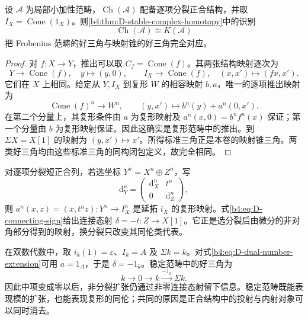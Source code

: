 \begin{proposition}\label{b4:prop:D-complex-triangle-identification}
	设 \(\mathcal A\) 为局部小加性范畴，\(\operatorname{Ch}(\mathcal A)\) 配备逐项分裂正合结构，并取 \(I_X=\operatorname{Cone}(1_X)\)。则\cref{b4:thm:D-stable-complex-homotopy}中的识别
	\[
		\underline{\operatorname{Ch}(\mathcal A)}\cong K(\mathcal A)
	\]
	把 Frobenius 范畴的好三角与映射锥的好三角完全对应。
\end{proposition}
\begin{proof}
	对 \(f:X\to Y\)，推出可以取 \(C_f=\operatorname{Cone}(f)\)。其两张结构映射逐次为
	\[
		Y\longrightarrow\operatorname{Cone}(f),\quad y\longmapsto(y,0), \qquad I_X\longrightarrow\operatorname{Cone}(f),\quad (x,x')\longmapsto(fx,x').
	\]
	它们在 \(X\) 上相同。给定从 \(Y,I_X\) 到复形 \(W\) 的相容映射 \(b,a\)，唯一的逐项推出映射为
	\[
		\operatorname{Cone}(f)^n\longrightarrow W^n, \qquad (y,x')\longmapsto b^n(y)+a^n(0,x').
	\]
	在第二个分量上，其复形条件由 \(a\) 为复形映射及 \(a^n(x,0)=b^n f^n(x)\) 保证；第一个分量由 \(b\) 为复形映射保证。因此这确实是复形范畴中的推出。到 \(\Sigma X=X[1]\) 的映射为 \((y,x')\mapsto x'\)。所得标准三角正是本卷的映射锥三角。两类好三角均由这些标准三角的同构闭包定义，故完全相同。
\end{proof}

对逐项分裂短正合列，若选坐标 \(Y^n=X^n\oplus Z^n\)，写
\[
	\mathrm{d}_Y^n=
	\begin{pmatrix}\mathrm{d}_X^n&t^n\\0&\mathrm{d}_Z^n\end{pmatrix},
\]
则 \(a^n(x,z)=(x,t^nz):Y^n\to I_X^n\) 是延拓 \(i_X\) 的复形映射。式\eqref{b4:eq:D-connecting-sign}给出连接态射 \(\delta=-t:Z\to X[1]\)。它正是选分裂后由微分的非对角部分得到的映射，换分裂只改变其同伦类代表。

\ProseParagraphBreak
在双数代数中，取 \(i_k(1)=\varepsilon\)、\(I_k=A\) 及 \(\Sigma k=k\)。对式\eqref{b4:eq:D-dual-number-extension}可用 \(a=1_A\)，于是 \(\delta=-1_k\)。稳定范畴中的好三角为
\[
	k\longrightarrow0\longrightarrow k\xrightarrow{-1_k}\Sigma k.
\]
因此中项变成零以后，非分裂扩张仍通过非零连接态射留下信息。稳定范畴既能表现模的扩张，也能表现复形的同伦；共同的原因是正合结构中的投射与内射对象可以同时消去。

